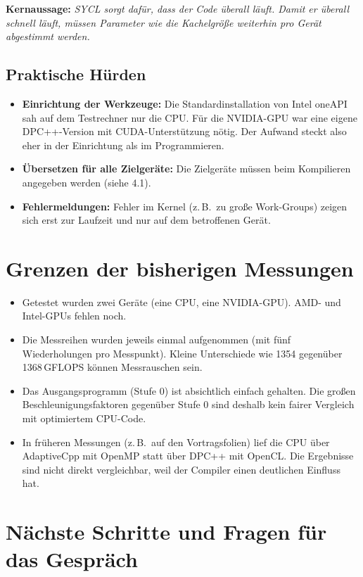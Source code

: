 \documentclass[11pt]{article}
\newcommand{\kernaussage}[1]{\par\smallskip\noindent\textbf{Kernaussage:} \emph{#1}\par\smallskip}
\begin{document}
\kernaussage{SYCL sorgt dafür, dass der Code überall läuft. Damit er überall
schnell läuft, müssen Parameter wie die Kachelgröße weiterhin pro Gerät
abgestimmt werden.}

\subsection{Praktische Hürden}

\begin{itemize}
    \item \textbf{Einrichtung der Werkzeuge:} Die Standardinstallation von
    Intel oneAPI sah auf dem Testrechner nur die CPU. Für die NVIDIA-GPU
    war eine eigene DPC++-Version mit CUDA-Unterstützung nötig. Der Aufwand
    steckt also eher in der Einrichtung als im Programmieren.
    \item \textbf{Übersetzen für alle Zielgeräte:} Die Zielgeräte müssen
    beim Kompilieren angegeben werden (siehe 4.1).
    \item \textbf{Fehlermeldungen:} Fehler im Kernel (z.\,B.\ zu große
    Work-Groups) zeigen sich erst zur Laufzeit und nur auf dem betroffenen
    Gerät.
\end{itemize}

\section{Grenzen der bisherigen Messungen}

\begin{itemize}
    \item Getestet wurden zwei Geräte (eine CPU, eine NVIDIA-GPU). AMD-
    und Intel-GPUs fehlen noch.
    \item Die Messreihen wurden jeweils einmal aufgenommen (mit fünf
    Wiederholungen pro Messpunkt). Kleine Unterschiede wie 1354 gegenüber
    1368\,GFLOPS können Messrauschen sein.
    \item Das Ausgangsprogramm (Stufe 0) ist absichtlich einfach gehalten.
    Die großen Beschleunigungsfaktoren gegenüber Stufe 0 sind deshalb kein
    fairer Vergleich mit optimiertem CPU-Code.
    \item In früheren Messungen (z.\,B.\ auf den Vortragsfolien) lief die
    CPU über AdaptiveCpp mit OpenMP statt über DPC++ mit OpenCL. Die
    Ergebnisse sind nicht direkt vergleichbar, weil der Compiler einen
    deutlichen Einfluss hat.
\end{itemize}

\section{Nächste Schritte und Fragen für das Gespräch}
\end{document}
